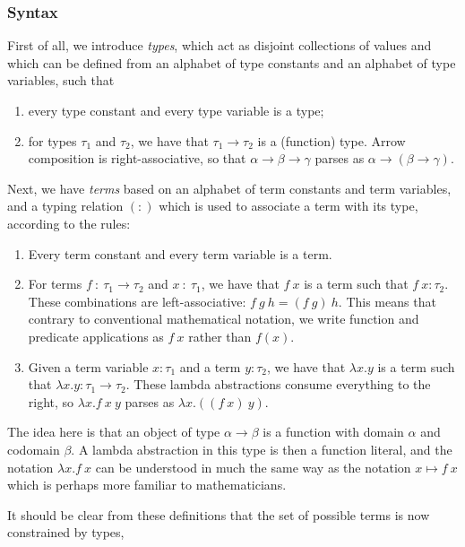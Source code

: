\subsubsection{Syntax}
First of all, we introduce \emph{types}, which act as disjoint collections of values and which can be defined from an alphabet of type constants and an alphabet of type variables, such that
\begin{enumerate}
\item every type constant and every type variable is a type;
\item for types $\tau_1$ and $\tau_2$, we have that $\tau_1 \rightarrow \tau_2$ is a (function) type. Arrow composition is right-associative, so that $\alpha \rightarrow \beta \rightarrow \gamma$ parses as $\alpha \rightarrow (\beta \rightarrow \gamma)$.
\end{enumerate}

Next, we have \emph{terms} based on an alphabet of term constants and term variables, and a typing relation $(:)$ which is used to associate a term with its type, according to the rules:
\begin{enumerate}
\item Every term constant and every term variable is a term.
\item For terms $f\ :\ \tau_1\rightarrow\tau_2$ and $x\ :\ \tau_1$, we have that $f\ x$ is a term such that $f\ x : \tau_2$. These combinations are left-associative: $f\ g\ h = (f\ g)\ h$. This means that contrary to conventional mathematical notation, we write function and predicate applications as $f\ x$ rather than $f(x)$.
\item Given a term variable $x : \tau_1$ and a term $y : \tau_2$, we have that $\lambda x. y$ is a term such that $\lambda x. y : \tau_1 \rightarrow \tau_2$. These lambda abstractions consume everything to the right, so $\lambda x. f\ x\ y$ parses as $\lambda x. ((f\ x)\ y)$.
\end{enumerate}

The idea here is that an object of type $\alpha \rightarrow \beta$ is a function with domain $\alpha$ and codomain $\beta$. A lambda abstraction in this type is then a function literal, and the notation $\lambda x. f\ x$ can be understood in much the same way as the notation $x \mapsto f\ x$ which is perhaps more familiar to mathematicians.

It should be clear from these definitions that the set of possible terms is now constrained by types, 

